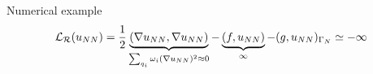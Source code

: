 \begin{frame}[t]{Numerical example}
\begin{equation}
\notag
\mathcal{L}_{\mathcal{R}}(u_{NN}) = \frac{1}{2} \underbrace{( \nabla u_{NN},\nabla u_{NN})}_{ \sum_{q_i} \omega_i (\nabla u_{NN})^2 \approx 0} - \underbrace{(f,u_{NN})}_{\infty} - (g,u_{NN})_{\Gamma_N} \simeq - \infty
\notag
\end{equation}

\begin{figure}[!htp]
\centering
	{} 
	\hspace{0.5cm}
	{}
\end{figure} 
\end{frame}

